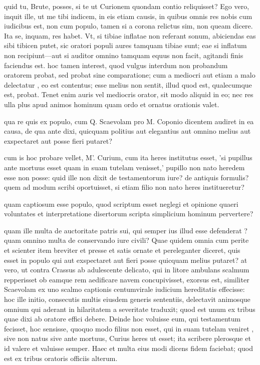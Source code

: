  quid tu, Brute, posses, si te ut Curionem quondam contio reliquisset? Ego vero, inquit ille, ut me tibi indicem, in eis etiam causis, in quibus omnis res nobis cum iudicibus est, non cum populo, tamen si a corona relictus sim, non queam dicere. Ita se, inquam, res habet. Vt, si tibiae inflatae non referant sonum, abiciendas eas sibi tibicen putet, sic oratori populi aures tamquam tibiae sunt; eae si inflatum non recipiunt—aut si auditor omnino tamquam equus non facit, agitandi finis faciendus est. hoc tamen interest, quod vulgus interdum non probandum oratorem probat, sed probat sine comparatione; cum a mediocri aut etiam a malo delectatur , eo est contentus; esse melius non sentit, illud quod est, qualecumque est, probat. Tenet enim auris vel mediocris orator, sit modo aliquid in eo; nec res ulla plus apud animos hominum quam ordo et ornatus orationis valet.

 qua re quis ex populo, cum Q. Scaevolam pro M. Coponio dicentem audiret in ea causa, de qua ante dixi, quicquam politius aut elegantius aut omnino melius aut exspectaret aut posse fieri putaret?

 cum is hoc probare vellet, M'. Curium, cum ita heres institutus esset, 'si pupillus ante mortuus esset quam in suam tutelam venisset,' pupillo non nato heredem esse non posse: quid ille non dixit de testamentorum iure? de antiquis formulis? quem ad modum scribi oportuisset, si etiam filio non nato heres institueretur?

 quam captiosum esse populo, quod scriptum esset neglegi et opinione quaeri voluntates et interpretatione disertorum scripta simplicium hominum pervertere?

 quam ille multa de auctoritate patris sui, qui semper ius illud esse defenderat ? quam omnino multa de conservando iure civili? Quae quidem omnia cum perite et scienter item breviter et presse et satis ornate et pereleganter diceret, quis esset in populo qui aut exspectaret aut fieri posse quicquam melius putaret? at vero, ut contra Crassus ab adulescente delicato, qui in litore ambulans scalmum repperisset ob eamque rem aedificare navem concupivisset, exorsus est, similiter Scaevolam ex uno scalmo captionis centumvirale iudicium hereditatis effecisse: hoc ille initio, consecutis multis eiusdem generis sententiis, delectavit animosque omnium qui aderant in hilaritatem a severitate traduxit; quod est unum ex tribus quae dixi ab oratore effici debere. Deinde hoc voluisse eum, qui testamentum fecisset, hoc sensisse, quoquo modo filius non esset, qui in suam tutelam veniret , sive non natus sive ante mortuus, Curius heres ut esset; ita scribere plerosque et id valere et valuisse semper. Haec et multa eius modi dicens fidem faciebat; quod est ex tribus oratoris officiis alterum.

